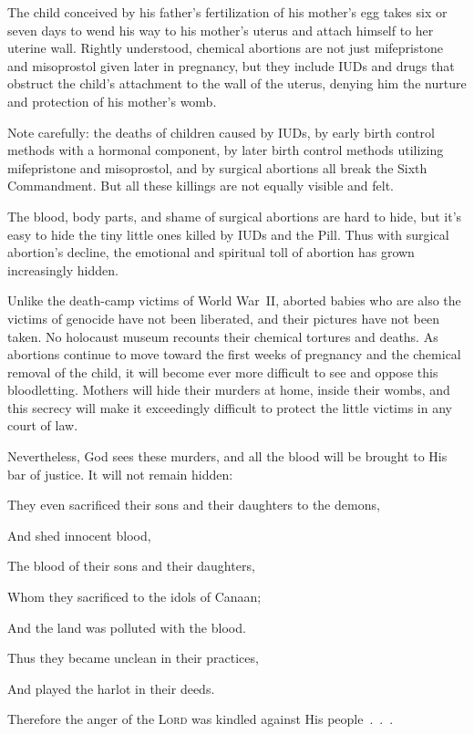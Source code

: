 \documentclass[
]{book}
\begin{document}
The child conceived by his father's fertilization of his mother's egg takes six or seven days to wend his way to his mother's uterus and attach himself to her uterine wall. Rightly understood, chemical abortions are not just mifepristone and misoprostol given later in pregnancy, but they include IUDs and drugs that obstruct the child's attachment to the wall of the uterus, denying him the nurture and protection of his mother's womb.

Note carefully: the deaths of children caused by IUDs, by early birth control methods with a hormonal component, by later birth control methods utilizing mifepristone and misoprostol, and by surgical abortions all break the Sixth Commandment. But all these killings are not equally visible and felt.

The blood, body parts, and shame of surgical abortions are hard to hide, but it's easy to hide the tiny little ones killed by IUDs and the Pill. Thus with surgical abortion's decline, the emotional and spiritual toll of abortion has grown increasingly hidden.

Unlike the death-camp victims of World War~II, aborted babies who are also the victims of genocide have not been liberated, and their pictures have not been taken. No holocaust museum recounts their chemical tortures and deaths. As abortions continue to move toward the first weeks of pregnancy and the chemical removal of the child, it will become ever more difficult to see and oppose this bloodletting. Mothers will hide their murders at home, inside their wombs, and this secrecy will make it exceedingly difficult to protect the little victims in any court of law.

Nevertheless, God sees these murders, and all the blood will be brought to His bar of justice. It will not remain hidden:

They even sacrificed their sons and their daughters to the demons,

And shed innocent blood,

The blood of their sons and their daughters,

Whom they sacrificed to the idols of Canaan;

And the land was polluted with the blood.

Thus they became unclean in their practices,

And played the harlot in their deeds.

Therefore the anger of the \textsc{Lord} was kindled against His people~.~.~.
\end{document}
